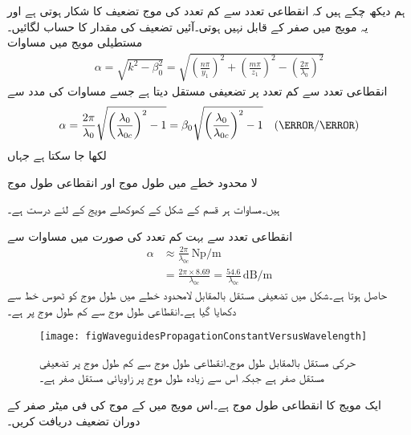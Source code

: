 ہم دیکھ چکے  ہیں کہ انقطاعی تعدد سے کم تعدد کی موج تضعیف کا شکار ہوتی ہے اور یہ مویج میں صفر کے قابل نہیں ہوتی۔آئیں تضعیف کی مقدار کا حساب لگائیں۔مستطیلی مویج میں مساوات 
\begin{align}
\alpha=\sqrt{k^2-\beta_0^2}=\sqrt{\left(\frac{n\pi}{y_1}\right)^2+\left(\frac{m\pi}{z_1}\right)^2-\left(\frac{2\pi}{\lambda_0}\right)^2}
\end{align}
 انقطاعی تعدد سے کم تعدد پر تضعیفی مستقل دیتا ہے جسے مساوات  کی مدد سے
\begin{align}\label{مساوات_مویج_تضعیفی_مستقل_عمومی_مساوات}
\alpha=\frac{2\pi}{\lambda_0}\sqrt{\left(\frac{\lambda_0}{\lambda_{0c}}\right)^2-1}=\beta_0 \sqrt{\left(\frac{\lambda_0}{\lambda_{0c}}\right)^2-1} \quad (\neper/\meter)
\end{align}
لکھا جا سکتا ہے جہاں
\begin{description}
 لا محدود خطے میں طول موج اور
 انقطاعی طول موج
\end{description}
ہیں۔مساوات  ہر قسم کے  شکل کے کھوکھلے مویج کے لئے درست ہے۔

انقطاعی تعدد سے بہت کم تعدد  کی صورت میں مساوات  سے
\begin{align}
\alpha &\approx \frac{2\pi}{\lambda_{0c}} \, \si{\neper/\meter}\\
&=\frac{2\pi \times 8.69}{\lambda_{0c}}=\frac{54.6}{\lambda_{0c}} \, \si{\deci\bel\per\meter}
\end{align}
حاصل ہوتا ہے۔شکل  میں تضعیفی مستقل  بالمقابل لامحدود خطے میں طول موج  کو ٹھوس خط سے دکھایا گیا ہے۔انقطاعی طول موج سے کم طول موج پر  ہے۔

\begin{figure}
\centering
\texttt{[image: figWaveguidesPropagationConstantVersusWavelength]}
\caption{حرکی مستقل بالمقابل طول موج۔انقطاعی طول موج سے  کم طول موج پر تضعیفی مستقل صفر ہے جبکہ اس سے زیادہ طول موج پر زاویائی مستقل صفر ہے۔}
\label{شکل_مویج_حرکی_مستقل_بالمقابل_طول_موج}
\end{figure}

ایک مویج کا انقطاعی طول موج  ہے۔اس مویج میں  کے موج کی فی میٹر صفر کے دوران تضعیف دریافت کریں۔

